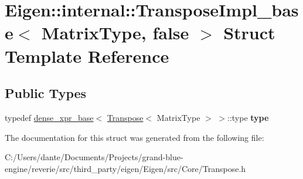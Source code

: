 \hypertarget{struct_eigen_1_1internal_1_1_transpose_impl__base_3_01_matrix_type_00_01false_01_4}{}\section{Eigen\+::internal\+::Transpose\+Impl\+\_\+base$<$ Matrix\+Type, false $>$ Struct Template Reference}
\label{struct_eigen_1_1internal_1_1_transpose_impl__base_3_01_matrix_type_00_01false_01_4}
\subsection*{Public Types}
\begin{DoxyCompactItemize}
\item 
\mbox{\label{struct_eigen_1_1internal_1_1_transpose_impl__base_3_01_matrix_type_00_01false_01_4_a613729dc09e3c791cf56e0c523637209}} 
typedef \mbox{\hyperlink{struct_eigen_1_1internal_1_1dense__xpr__base}{dense\+\_\+xpr\+\_\+base}}$<$ \mbox{\hyperlink{class_eigen_1_1_transpose}{Transpose}}$<$ Matrix\+Type $>$ $>$\+::type {\bfseries type}
\end{DoxyCompactItemize}


The documentation for this struct was generated from the following file\+:\begin{DoxyCompactItemize}
\item 
C\+:/\+Users/dante/\+Documents/\+Projects/grand-\/blue-\/engine/reverie/src/third\+\_\+party/eigen/\+Eigen/src/\+Core/Transpose.\+h\end{DoxyCompactItemize}
